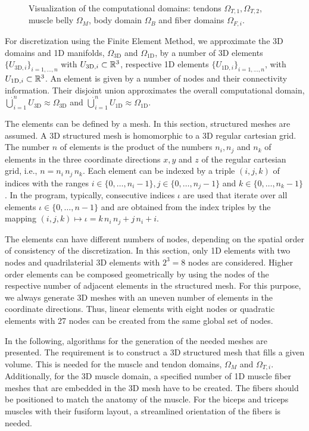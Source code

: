 \begin{figure}%
    \centering%
    \def\svgwidth{8cm}%
    \caption{Visualization of the computational domains: tendons $\Omega_{T,1}, \Omega_{T,2}$, muscle belly $\Omega_M$, body domain $\Omega_B$ and fiber domains $\Omega_{F,i}$.}%
    \label{fig:fibers_domains}%
\end{figure}%

For discretization using the Finite Element Method, we approximate the 3D domains and 1D manifolds, $\Omega_\text{3D}$ and $\Omega_\text{1D}$, 
by a number of 3D elements $\{U_{\text{3D},i}\}_{i=1,\dots,n}$ with $U_{\text{3D},i} \subset \mathbb{R}^3$, respective 1D elements $\{U_{\text{1D},i}\}_{i=1,\dots,n}$, with $U_{\text{1D},i}\subset \mathbb{R}^3$.
An element is given by a number of nodes and their connectivity information. Their disjoint union approximates the overall computational domain,
 $\dot{\bigcup}_{i=1}^{n} U_\text{3D} \approx \Omega_\text{3D}$ and $\dot\bigcup_{i=1}^{n} U_\text{1D} \approx \Omega_\text{1D}$.

The elements can be defined by a mesh. In this section, structured meshes are assumed. 
A 3D structured mesh is homomorphic to a 3D regular cartesian grid. 
The number $n$ of elements is the product of the numbers $n_i, n_j$ and $n_k$ of elements in the three coordinate directions $x,y$ and $z$ of the regular cartesian grid,
 i.e., $n = n_i\,n_j\, n_k$.
Each element can be indexed by a triple $(i,j,k)$ of indices with the ranges $i \in \{0,\dots,n_i-1\}, j \in \{0,\dots, n_j-1\}$ and $k \in \{0,\dots,n_k-1\}$. 
In the program, typically, consecutive indices $\iota$ are used that iterate over all elements $\iota \in \{0,\dots,n-1\}$ and are obtained from the index triples by the mapping 
$(i,j,k) \mapsto \iota = k\,n_i\,n_j + j\,n_i + i$.

The elements can have different numbers of nodes, depending on the spatial order of consistency of the discretization. 
In this section, only 1D elements with two nodes and quadrilaterial 3D elements with $2^3=8$ nodes are considered. 
Higher order elements can be composed geometrically by using the nodes of the respective number of adjacent elements in the structured mesh.
For this purpose, we always generate 3D meshes with an uneven number of elements in the coordinate directions. 
Thus, linear elements with eight nodes or quadratic elements with 27 nodes can be created from the same global set of nodes.

In the following, algorithms for the generation of the needed meshes are presented. 
The requirement is to construct a 3D structured mesh that fills a given volume. This is needed for the muscle and tendon domains, $\Omega_M$ and $\Omega_{T,i}$.
Additionally, for the 3D muscle domain, a specified number of 1D muscle fiber meshes that are embedded in the 3D mesh have to be created. 
The fibers should be positioned to match the anatomy of the muscle. For the biceps and triceps muscles with their fusiform layout,
a streamlined orientation of the fibers is needed.

